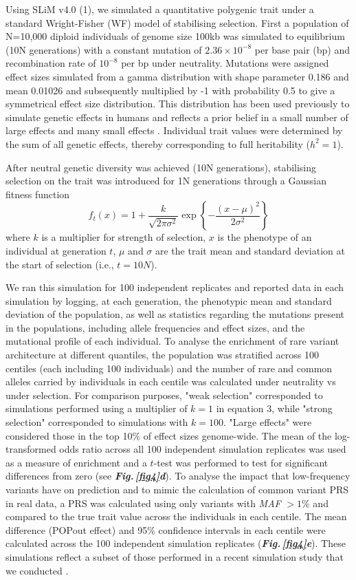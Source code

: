 \documentclass[12pt]{zHenriquesLab-StyleBioRxiv}
\newcommand\dref[2]{\normalsize{\textbf{\textit{Fig.\,\ref{#1}#2}}}\normalsize{}}
\begin{document}
{{Using SLiM v4.0 (1), we simulated a quantitative polygenic trait under
a standard Wright-Fisher (WF) model of stabilising selection. First a
population of N=10,000 diploid individuals of genome size 100kb was simulated to
equilibrium (10N generations) with a constant mutation of
$2.36\times 10^{-8}$ per base pair (bp) and recombination rate of
$10^{-8}$ per bp under neutrality. Mutations were assigned effect
sizes simulated from a gamma distribution with shape parameter 0.186
and mean 0.01026 and subsequently multiplied by -1 with probability
0.5 to give a symmetrical effect size distribution. This distribution
has been used previously to simulate genetic effects in humans and
reflects a prior belief in a small number of large effects and many
small effects \cite{anil3}. Individual trait values were determined by
the sum of all genetic effects, thereby corresponding to full heritability ($h^2 =1$).

After neutral genetic diversity was achieved (10N generations),
stabilising selection on the trait was introduced for 1N
generations through a Gaussian fitness function
\begin{equation} 
  f_t(x) = 1 + \frac{k}{\sqrt{2\pi\sigma^2}} \exp\left\{-\frac{(x-\mu)^2}{2\sigma^2}\right\}
\end{equation}
where $k$ is a multiplier for strength of selection,
$x$ is the phenotype of an individual at generation $t$, $\mu$
and $\sigma$ are the trait mean and standard deviation at the start of
selection (i.e., $t=10N$).

We ran this simulation for 100 independent replicates and reported data in 
each simulation by logging, at each generation, the phenotypic mean and standard 
deviation of the population, as well as statistics regarding the mutations present in the 
populations, including allele frequencies and effect sizes, and the mutational profile of each individual. 
To analyse the enrichment of rare variant architecture at different quantiles, the population 
was stratified across 100 centiles (each including 100 individuals) and the number of rare and common 
alleles carried by individuals in each centile was calculated under neutrality vs under selection.  For comparison 
purposes, "weak selection" corresponded to simulations performed using a multiplier of $k=1$ in equation 3, 
while "strong selection" corresponded to simulations with $k=100$. "Large effects" were considered 
those in the top 10\% of effect sizes genome-wide.   The mean of the log-transformed odds ratio across 
all 100 independent simulation replicates was used as a measure of enrichment and a $t$-test was 
performed to test for significant differences from zero (see \dref{fig4}{d}).  To analyse the impact 
that low-frequency variants have on prediction and to mimic the calculation of common 
variant PRS in real data, a PRS was calculated using only variants with \emph{MAF} $>1\%$ 
and compared to the true trait value across the individuals in each centile.  The mean difference (POPout effect) 
and 95\% confidence intervals in each centile were calculated across the 100 independent simulation 
replicates (\dref{fig4}{e}). These simulations reflect a subset of those performed in a recent simulation study 
that we conducted \cite{Ori2024}.

}}
\end{document}
